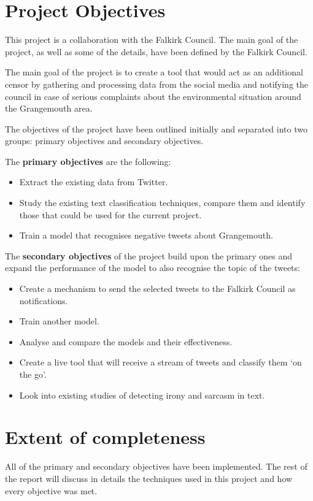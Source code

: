\section{Project Objectives}
\label{sec:objectives}

This project is a collaboration with the Falkirk Council. The main goal of the project, as well as some of the details, have been defined by the Falkirk Council.

The main goal of the project is to create a tool that would act as an additional censor by gathering and processing data from the social media and notifying the council in case of serious complaints about the environmental situation around the Grangemouth area. 

The objectives of the project have been outlined initially and separated into two groups: primary objectives and secondary objectives.

The \textbf{primary objectives} are the following:
\begin{itemize}
    \item Extract the existing data from Twitter. 
    \item Study the existing text classification techniques, compare them and identify those that could be used for the current project.
    \item Train a model that recognises negative tweets about Grangemouth.
\end{itemize}

The \textbf{secondary objectives} of the project build upon the primary ones and expand the performance of the model to also recognise the topic of the tweets:
\begin{itemize}
    \item Create a mechanism to send the selected tweets to the Falkirk Council as notifications. 
    \item Train another model.
    \item Analyse and compare the models and their effectiveness.
    \item Create a live tool that will receive a stream of tweets and classify them `on the go'.
    \item Look into existing studies of detecting irony and sarcasm in text.
\end{itemize}

\section{Extent of completeness}
\label{sec:completeness}

All of the primary and secondary objectives have been implemented. The rest of the report will discuss in details the techniques used in this project and how every objective was met. 
